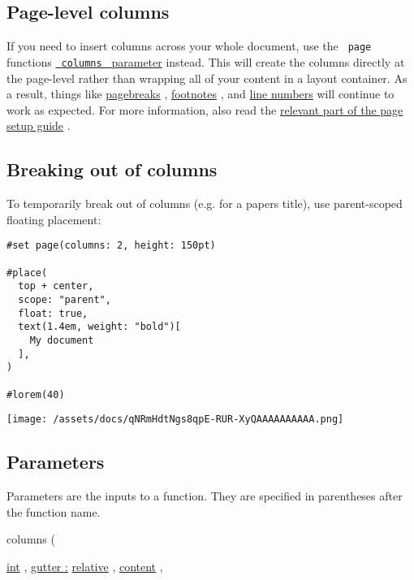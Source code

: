 \subsection{Page-level columns}\label{page-level}

If you need to insert columns across your whole document, use the
\texttt{\ page\ } function\textquotesingle s
\href{/docs/reference/layout/page/\#parameters-columns}{\texttt{\ columns\ }
parameter} instead. This will create the columns directly at the
page-level rather than wrapping all of your content in a layout
container. As a result, things like
\href{/docs/reference/layout/pagebreak/}{pagebreaks} ,
\href{/docs/reference/model/footnote/}{footnotes} , and
\href{/docs/reference/model/par/\#definitions-line}{line numbers} will
continue to work as expected. For more information, also read the
\href{/docs/guides/page-setup-guide/\#columns}{relevant part of the page
setup guide} .

\subsection{Breaking out of columns}\label{breaking-out}

To temporarily break out of columns (e.g. for a paper\textquotesingle s
title), use parent-scoped floating placement:

\begin{verbatim}
#set page(columns: 2, height: 150pt)

#place(
  top + center,
  scope: "parent",
  float: true,
  text(1.4em, weight: "bold")[
    My document
  ],
)

#lorem(40)
\end{verbatim}

\texttt{[image: /assets/docs/qNRmHdtNgs8qpE-RUR-XyQAAAAAAAAAA.png]}

\subsection{\texorpdfstring{{ Parameters
}}{ Parameters }}\label{parameters}

\label{parameters-tooltip}
Parameters are the inputs to a function. They are specified in
parentheses after the function name.

{ columns } (

{ \hyperref[parameters-count]{}
\href{/docs/reference/foundations/int/}{int} , } {
\hyperref[parameters-gutter]{gutter :}
\href{/docs/reference/layout/relative/}{relative} , } {
\href{/docs/reference/foundations/content/}{content} , }

